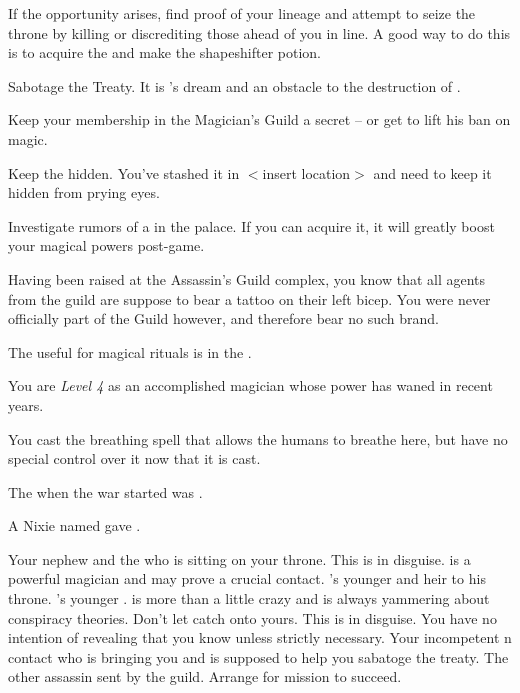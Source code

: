 \documentclass[char]{NeptuneBall}
\begin{document}
\begin{itemz}[Goals]
  \item If the opportunity arises, find proof of your lineage and attempt to seize the throne by killing or discrediting those ahead of you in line. A good way to do this is to acquire the \iHemlock{} and make the shapeshifter potion.
  \item Sabotage the Treaty. It is \cKing{}'s dream and an obstacle to the destruction of \pAtlantis{}.
  \item Keep your membership in the Magician's Guild a secret -- or get \cKing{\King} \cKing{} to lift his ban on magic.
  \item Keep the \iMusicBox{} hidden. You've stashed it in $<$insert location$>$ and need to keep it hidden from prying eyes.
  \item Investigate rumors of a \iGlowShell{} in the palace. If you can acquire it, it will greatly boost your magical powers post-game.
\end{itemz}

\begin{itemz}[Notes]
  \item Having been raised at the Assassin's Guild complex, you know that all agents from the guild are suppose to bear a tattoo on their left bicep. You were never officially part of the Guild however, and therefore bear no such brand.
	\item The \sRunicCircle{} useful for magical rituals is in the \pCaves{\MYname}.
	\item You are \emph{Level 4} as an accomplished magician whose power has waned in recent years.
  \item You cast the breathing spell that allows the humans to breathe here, but have no special control over it now that it is cast.
\end{itemz}

\begin{itemz}[Trivia]
  \item The \cExExKing{\King} when the war started was \cExExKing{}.
	\item A Nixie named \cNixie{} gave \cExKing{} \iTrident{\MYname}.
\end{itemz}

\begin{contacts}
  \contact{\cKing{}} Your nephew and the \cKing{\mer} who is sitting on your throne.
  \contact{\cWitch{\MYname}} This is \cWitch{} in disguise. \cWitch{\They} is a powerful magician and may prove a crucial contact.
  \contact{\cPrincess{}} \cKing{}'s younger \cPrincess{\offspring} and heir to his throne.
  \contact{\cPlant{}} \cKing{}'s younger \cPlant{\sibling}. \cPlant{\they} is more than a little crazy and is always yammering about conspiracy theories. Don't let \cPlant{\them} catch onto yours.
  \contact{\cQueen{\MYname}} This is \cQueen{} in disguise. You have no intention of revealing that you know \cQueen{\them} unless strictly necessary.
  \contact{\cSpy{}} Your incompetent \pPacifica{}n contact who is bringing you \iHemlock{} and is supposed to help you sabatoge the treaty.
	\contact{\cDiplomat{}} The other assassin sent by the guild. Arrange for \cDiplomat{\their} mission to succeed.
\end{contacts}
\end{document}
